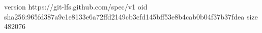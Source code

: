 version https://git-lfs.github.com/spec/v1
oid sha256:965fd387a9c1e8133e6a72ffd2149cb3cfd145bff53e8b4cab0b04f37b37fdea
size 482076
